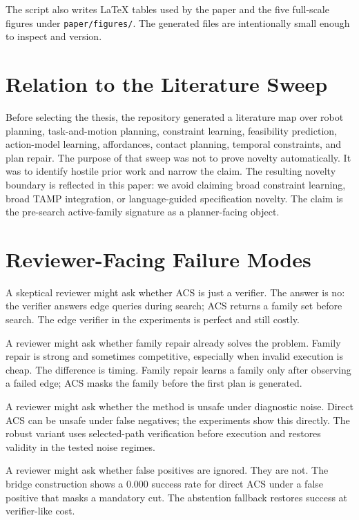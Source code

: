 \documentclass{article}
\newcommand{\ACS}{\textsc{ACS}}
\begin{document}
The script also writes LaTeX tables used by the paper and the five full-scale figures under \texttt{paper/figures/}. The generated files are intentionally small enough to inspect and version.

\section{Relation to the Literature Sweep}

Before selecting the thesis, the repository generated a literature map over robot planning, task-and-motion planning, constraint learning, feasibility prediction, action-model learning, affordances, contact planning, temporal constraints, and plan repair. The purpose of that sweep was not to prove novelty automatically. It was to identify hostile prior work and narrow the claim. The resulting novelty boundary is reflected in this paper: we avoid claiming broad constraint learning, broad TAMP integration, or language-guided specification novelty. The claim is the pre-search active-family signature as a planner-facing object.

\section{Reviewer-Facing Failure Modes}

A skeptical reviewer might ask whether \ACS{} is just a verifier. The answer is no: the verifier answers edge queries during search; \ACS{} returns a family set before search. The edge verifier in the experiments is perfect and still costly.

A reviewer might ask whether family repair already solves the problem. Family repair is strong and sometimes competitive, especially when invalid execution is cheap. The difference is timing. Family repair learns a family only after observing a failed edge; \ACS{} masks the family before the first plan is generated.

A reviewer might ask whether the method is unsafe under diagnostic noise. Direct \ACS{} can be unsafe under false negatives; the experiments show this directly. The robust variant uses selected-path verification before execution and restores validity in the tested noise regimes.

A reviewer might ask whether false positives are ignored. They are not. The bridge construction shows a 0.000 success rate for direct \ACS{} under a false positive that masks a mandatory cut. The abstention fallback restores success at verifier-like cost.
\end{document}

